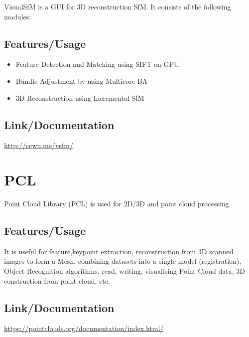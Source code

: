 \documentclass{article}[11pt]
\begin{document}
VisualSfM is a GUI for 3D reconstruction SfM. It consists of the following modules:


\subsection{Features/Usage}

\begin{itemize}
    \item Feature Detection and Matching using SIFT on GPU.
    \item Bundle Adjustment by using Multicore BA
    \item 3D Reconstruction using Incremental SfM 
\end{itemize}

\subsection{Link/Documentation}
\url{http://ccwu.me/vsfm/}


\section{PCL}


Point Cloud Library (PCL) is used for 2D/3D and point cloud processing.

\subsection{Features/Usage}

It is useful for feature,keypoint extraction, reconstruction from 3D scanned images to form a Mesh, combining datasets into a single model (registration), Object Recognition algorithms, read, writing, visualising Point Cloud data, 3D construction from point cloud, etc.

\subsection{Link/Documentation}
\url{https://pointclouds.org/documentation/index.html/}
\end{document}
